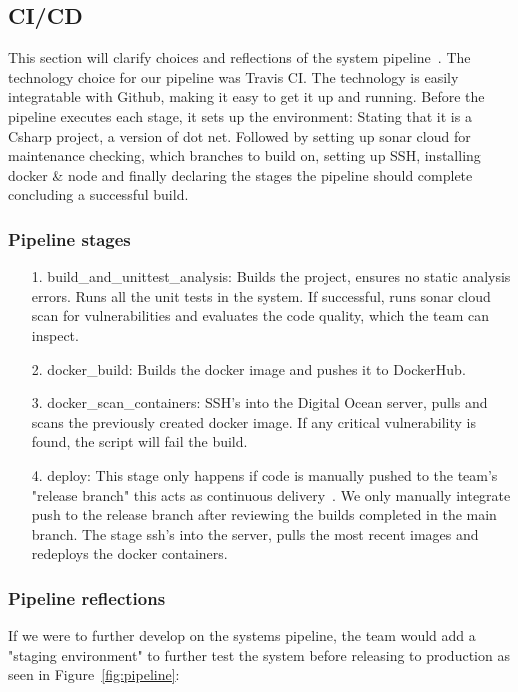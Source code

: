 \subsection{CI/CD}
\label{cicd:label}

This section will clarify choices and reflections of the system pipeline~\cite{travis}. The technology choice for our pipeline was Travis CI. The technology is easily integratable with Github, making it easy to get it up and running. Before the pipeline executes each stage, it sets up the environment: Stating that it is a Csharp project, a version of dot net. Followed by setting up sonar cloud for maintenance checking, which branches to build on, setting up SSH, installing docker \& node and finally declaring the stages the pipeline should complete concluding a successful build.

\subsubsection*{Pipeline stages}

\begin{enumerate}
  \item[1.] build\_and\_unittest\_analysis: Builds the project, ensures no static analysis errors. Runs all the unit tests in the system. If successful, runs sonar cloud scan for vulnerabilities and evaluates the code quality, which the team can inspect.
  \item[2.] docker\_build: Builds the docker image and pushes it to DockerHub.
  \item[3.] docker\_scan\_containers: SSH's into the Digital Ocean server, pulls and scans the previously created docker image. If any critical vulnerability is found,  the script will fail the build.
  \item[4.] deploy: This stage only happens if code is manually pushed to the team's "release branch" this acts as continuous delivery~\cite{devOpsHandbookCD}. We only manually integrate push to the release branch after reviewing the builds completed in the main branch. The stage ssh's into the server, pulls the most recent images and redeploys the docker containers.
\end{enumerate}

\subsubsection*{Pipeline reflections}

If we were to further develop on the systems pipeline, the team would add a "staging environment" to further test the system before releasing to production as seen in Figure~\ref{fig:pipeline}:

